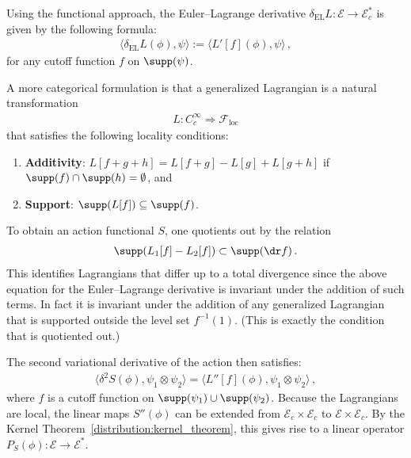     Using the functional approach, the Euler--Lagrange derivative $\delta_{\text{EL}}L:\mathcal{E}\rightarrow\mathcal{E}^*_c$ is given by the following formula:
    \begin{gather}
        \langle\delta_{\text{EL}}L(\phi),\psi\rangle := \langle L'[f](\phi),\psi \rangle\,,
    \end{gather}
    for any cutoff function $f$ on $\supp(\psi)$.
    \begin{remark}[Functoriality]
        A more categorical formulation is that a generalized Lagrangian is a natural transformation
        \begin{gather}
            L:C^\infty_c\Rightarrow\mathcal{F}_\text{loc}
        \end{gather}
        that satisfies the following locality conditions:
        \begin{enumerate}
            \item\textbf{Additivity}: $L[f+g+h] = L[f+g]-L[g]+L[g+h]$ if $\supp(f)\cap\supp(h)=\emptyset$, and
            \item\textbf{Support}: $\supp(L[f])\subseteq\supp(f)$.
        \end{enumerate}
        To obtain an action functional $S$, one quotients out by the relation
        \begin{gather}
            \supp(L_1[f]-L_2[f])\subset\supp(\dr f)\,.
        \end{gather}
        This identifies Lagrangians that differ up to a total divergence since the above equation for the Euler--Lagrange derivative is invariant under the addition of such terms. In fact it is invariant under the addition of any generalized Lagrangian that is supported outside the level set $f^{-1}(1)$. (This is exactly the condition that is quotiented out.)
    \end{remark}

    The second variational derivative of the action then satisfies:
    \begin{gather}
        \langle\delta^2S(\phi),\psi_1\otimes\psi_2 \rangle = \langle L''[f](\phi),\psi_1\otimes\psi_2 \rangle\,,
    \end{gather}
    where $f$ is a cutoff function on $\supp(\psi_1)\cup\supp(\psi_2)$. Because the Lagrangians are local, the linear maps $S''(\phi)$ can be extended from $\mathcal{E}_c\times\mathcal{E}_c$ to $\mathcal{E}\times\mathcal{E}_c$. By the Kernel Theorem~\ref{distribution:kernel_theorem}, this gives rise to a linear operator $P_S(\phi):\mathcal{E}\rightarrow\mathcal{E}^*$.

